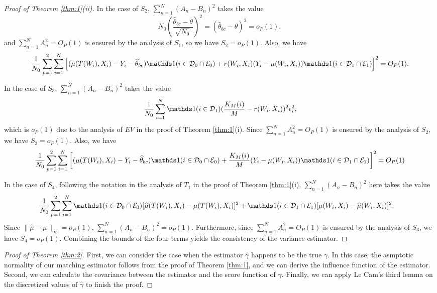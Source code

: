 \documentclass[11pt]{article}
\numberwithin{equation}{section}
\theoremstyle{definition}
\begin{document}
\begin{proof}[Proof of Theorem \ref{thm:1}(ii)]
In the case of $S_2$, $\sum_{n=1}^N(A_n-B_n)^2$ takes the value 
\[N_0\left(\frac{\widehat{\theta}_{bc}-\theta}{\sqrt{N_0}}\right)^2=(\widehat{\theta}_{bc}-\theta)^2=o_P(1),\]
and $\sum_{n=1}^NA_n^2=O_P(1)$ is ensured by the analysis of $S_1$, so we have $S_2=o_P(1)$. Also, we have
\[\frac{1}{N_0}\sum_{p=1}^2\sum_{i=1}^N\left[(\mu(T(W_i),X_i)-Y_i-\widehat{\theta}_{bc})\ind(i \in \mathcal{D}_0\cap\mathcal{E}_0)+r(W_i,X_i)(Y_{i}-\mu(W_{i},X_{i}))\ind(i \in \mathcal{D}_1\cap\mathcal{E}_1)\right]^2=O_P(1).\]

In the case of $S_3$, $\sum_{n=1}^N(A_n-B_n)^2$ takes the value 
\[\frac{1}{N_0}\sum_{i=1}^N \ind(i\in\mathcal{D}_1)(\frac{K_M(i)}{M}-r(W_i,X_i))^2\epsilon_i^2,\] 
which is $o_P(1)$ due to the analysis of $EV$ in the proof of Theorem \ref{thm:1}(i). Since $\sum_{n=1}^NA_n^2=O_P(1)$ is ensured by the analysis of $S_2$, we have $S_3=o_P(1)$.
Also, we have 
\[\frac{1}{N_0}\sum_{p=1}^2\sum_{i=1}^N\left[(\mu(T(W_i),X_i)-Y_i-\widehat{\theta}_{bc})\ind(i \in \mathcal{D}_0\cap\mathcal{E}_0)+\frac{K_M(i)}{M}(Y_{i}-\mu(W_{i},X_{i}))\ind(i \in \mathcal{D}_1\cap\mathcal{E}_1)\right]^2=O_P(1)\]

In the case of $S_4$, following the notation in the analysis of $T_1$ in the proof of Theorem \ref{thm:1}(i), $\sum_{n=1}^N(A_n-B_n)^2$ here takes the value
\begin{align*}
    &\frac{1}{N_0}\sum_{p=1}^2\sum_{i=1}^N\ind(i\in \mathcal{D}_0\cap\mathcal{E}_0)[\widehat{\mu}(T(W_i),X_i)-\mu(T(W_i),X_i)]^2+\ind(i\in \mathcal{D}_1\cap\mathcal{E}_1)[\mu(W_i,X_i)-\widehat{\mu}(W_i,X_i)]^2.
\end{align*}
Since $\|\widehat{\mu}-\mu\|_\infty=o_P(1)$, $\sum_{n=1}^N(A_n-B_n)^2=o_P(1)$. Furthermore, since $\sum_{n=1}^NA_n^2=O_P(1)$ is ensured by the analysis of $S_3$, we have $S_4=o_P(1)$. Combining the bounds of the four terms yields the consistency of the variance estimator.
\end{proof}

\begin{proof}[Proof of Theorem \ref{thm:2}]
    First, we can consider the case when the estimator $\widehat{\gamma}$ happens to be the true $\gamma$. In this case, the asmptotic normality of our matching estimator follows from the proof of Theorem \ref{thm:1}, and we can derive the influence function of the estimator. Second, we can calculate the covariance between the estimator and the score function of $\gamma$. Finally, we can apply Le Cam's third lemma on the discretized values of $\widehat{\gamma}$ to finish the proof.
\end{proof}
{%


}
\end{document}
